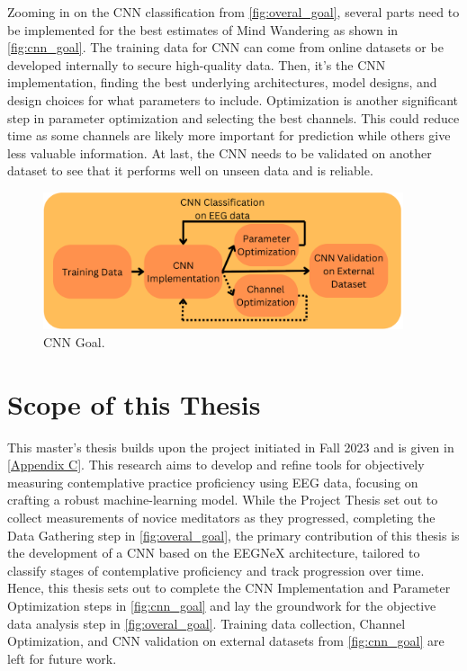 Zooming in on the CNN classification from \autoref{fig:overal_goal}, several parts need to be implemented for the best estimates of Mind Wandering as shown in \autoref{fig:cnn_goal}. The training data for CNN can come from online datasets or be developed internally to secure high-quality data. Then, it's the CNN implementation, finding the best underlying architectures, model designs, and design choices for what parameters to include. Optimization is another significant step in parameter optimization and selecting the best channels. This could reduce time as some channels are likely more important for prediction while others give less valuable information. At last, the CNN needs to be validated on another dataset to see that it performs well on unseen data and is reliable. 

\begin{figure}[H]
    \centering
    \includegraphics[width=400px]{Figures/cnn_flow.png}
    \caption{CNN Goal.}
    \label{fig:cnn_goal}
\end{figure}

\section{Scope of this Thesis}

This master's thesis builds upon the project initiated in Fall 2023 and is given in \autoref{Appendix C}. This research aims to develop and refine tools for objectively measuring contemplative practice proficiency using EEG data, focusing on crafting a robust machine-learning model. While the Project Thesis set out to collect measurements of novice meditators as they progressed, completing the Data Gathering step in \autoref{fig:overal_goal}, the primary contribution of this thesis is the development of a CNN based on the EEGNeX architecture, tailored to classify stages of contemplative proficiency and track progression over time. Hence, this thesis sets out to complete the CNN Implementation and Parameter Optimization steps in \autoref{fig:cnn_goal} and lay the groundwork for the objective data analysis step in \autoref{fig:overal_goal}. Training data collection, Channel Optimization, and CNN validation on external datasets from \autoref{fig:cnn_goal} are left for future work.

